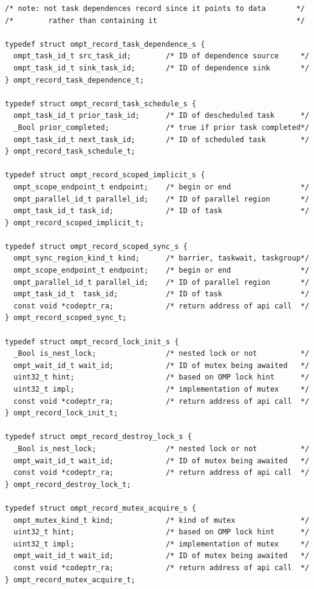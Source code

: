 \documentclass{article}
\begin{document}
\begin{verbatim}
/* note: not task dependences record since it points to data       */
/*        rather than containing it                                */

typedef struct ompt_record_task_dependence_s {
  ompt_task_id_t src_task_id;        /* ID of dependence source     */
  ompt_task_id_t sink_task_id;       /* ID of dependence sink       */
} ompt_record_task_dependence_t;

typedef struct ompt_record_task_schedule_s {
  ompt_task_id_t prior_task_id;      /* ID of descheduled task      */
  _Bool prior_completed;             /* true if prior task completed*/
  ompt_task_id_t next_task_id;       /* ID of scheduled task        */
} ompt_record_task_schedule_t;

typedef struct ompt_record_scoped_implicit_s {
  ompt_scope_endpoint_t endpoint;    /* begin or end                */
  ompt_parallel_id_t parallel_id;    /* ID of parallel region       */
  ompt_task_id_t task_id;            /* ID of task                  */
} ompt_record_scoped_implicit_t;

typedef struct ompt_record_scoped_sync_s {
  ompt_sync_region_kind_t kind;      /* barrier, taskwait, taskgroup*/
  ompt_scope_endpoint_t endpoint;    /* begin or end                */ 
  ompt_parallel_id_t parallel_id;    /* ID of parallel region       */
  ompt_task_id_t  task_id;           /* ID of task                  */
  const void *codeptr_ra;            /* return address of api call  */
} ompt_record_scoped_sync_t;

typedef struct ompt_record_lock_init_s {
  _Bool is_nest_lock;                /* nested lock or not          */
  ompt_wait_id_t wait_id;            /* ID of mutex being awaited   */
  uint32_t hint;                     /* based on OMP lock hint      */
  uint32_t impl;                     /* implementation of mutex     */
  const void *codeptr_ra;            /* return address of api call  */          
} ompt_record_lock_init_t;

typedef struct ompt_record_destroy_lock_s {
  _Bool is_nest_lock;                /* nested lock or not          */
  ompt_wait_id_t wait_id;            /* ID of mutex being awaited   */
  const void *codeptr_ra;            /* return address of api call  */       
} ompt_record_destroy_lock_t;

typedef struct ompt_record_mutex_acquire_s {
  ompt_mutex_kind_t kind;            /* kind of mutex               */
  uint32_t hint;                     /* based on OMP lock hint      */
  uint32_t impl;                     /* implementation of mutex     */
  ompt_wait_id_t wait_id;            /* ID of mutex being awaited   */
  const void *codeptr_ra;            /* return address of api call  */          
} ompt_record_mutex_acquire_t;


\end{verbatim}
\end{document}
